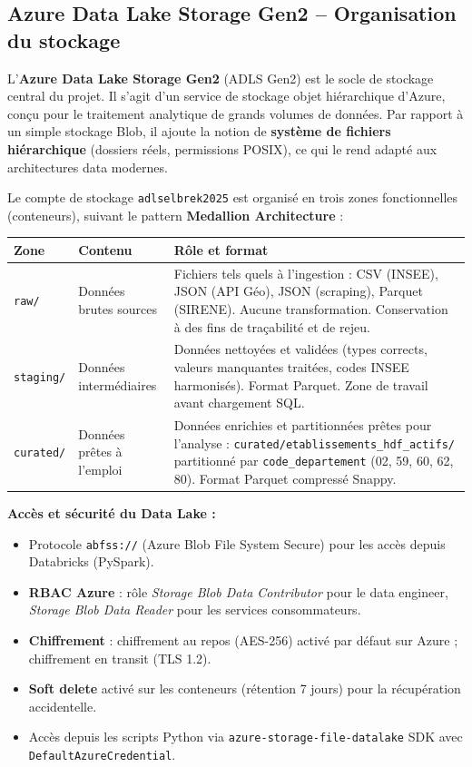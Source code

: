 \documentclass[11pt,a4paper]{article}
\begin{document}
\subsection{Azure Data Lake Storage Gen2 -- Organisation du stockage}

L'\textbf{Azure Data Lake Storage Gen2} (ADLS Gen2) est le socle de stockage central du projet.
Il s'agit d'un service de stockage objet hiérarchique d'Azure, conçu pour le traitement analytique
de grands volumes de données. Par rapport à un simple stockage Blob, il ajoute la notion de
\textbf{système de fichiers hiérarchique} (dossiers réels, permissions POSIX), ce qui le rend adapté
aux architectures data modernes.

Le compte de stockage \texttt{adlselbrek2025} est organisé en trois zones fonctionnelles (conteneurs),
suivant le pattern \textbf{Medallion Architecture} :

\begin{tabular}{L{2.5cm} L{4cm} L{7cm}}
  \toprule
  \textbf{Zone} & \textbf{Contenu} & \textbf{Rôle et format} \\
  \midrule
  \texttt{raw/} & Données brutes sources & Fichiers tels quels à l'ingestion : CSV (INSEE), JSON (API Géo), JSON (scraping), Parquet (SIRENE). Aucune transformation. Conservation à des fins de traçabilité et de rejeu. \\[0.6em]
  \texttt{staging/} & Données intermédiaires & Données nettoyées et validées (types corrects, valeurs manquantes traitées, codes INSEE harmonisés). Format Parquet. Zone de travail avant chargement SQL. \\[0.6em]
  \texttt{curated/} & Données prêtes à l'emploi & Données enrichies et partitionnées prêtes pour l'analyse : \texttt{curated/etablissements\_hdf\_actifs/} partitionné par \texttt{code\_departement} (02, 59, 60, 62, 80). Format Parquet compressé Snappy. \\
  \bottomrule
\end{tabular}

\vspace{0.4em}
\textbf{Accès et sécurité du Data Lake :}
\begin{itemize}
  \item Protocole \texttt{abfss://} (Azure Blob File System Secure) pour les accès depuis Databricks (PySpark).
  \item \textbf{RBAC Azure} : rôle \textit{Storage Blob Data Contributor} pour le data engineer, \textit{Storage Blob Data Reader} pour les services consommateurs.
  \item \textbf{Chiffrement} : chiffrement au repos (AES-256) activé par défaut sur Azure ; chiffrement en transit (TLS 1.2).
  \item \textbf{Soft delete} activé sur les conteneurs (rétention 7 jours) pour la récupération accidentelle.
  \item Accès depuis les scripts Python via \texttt{azure-storage-file-datalake} SDK avec \texttt{DefaultAzureCredential}.
\end{itemize}
\end{document}

